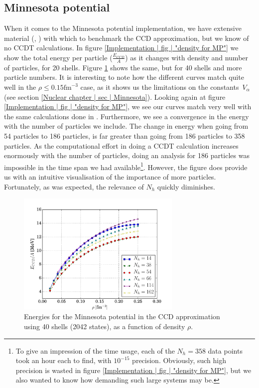\documentclass[10pt,twoside]{report}
\begin{document}
	\subsection{Minnesota potential}
	When it comes to the Minnesota potential implementation, we have extensive material (\cite{Holmen16}, \cite{HJensenLombardoKolck16}) with which to benchmark the CCD approximation, but we know of no CCDT calculations. In figure \ref{Implementation | fig | "density for MP"} we show the total energy per particle ($\frac{E_{CCD}}{A}$) as it changes with density and number of particles, for 20 shells. Figure \ref{Implementation | fig | "MP rho dependency Ns=40"} shows the same, but for 40 shells and more particle numbers. It is interesting to note how the different curves match quite well in the $\rho\leq 0.15\text{fm}^{-3}$ case, as it shows us the limitations on the constants $V_\alpha$ (see section \ref{Nuclear chapter | sec | Minnesota}). Looking again at figure \ref{Implementation | fig | "density for MP"}, we see our curves match very well with the same calculations done in \cite{HJensenLombardoKolck16}. Furthermore, we see a convergence in the energy with the number of particles we include. The change in energy when going from 54 particles to 186 particles, is far greater than going from 186 particles to 358 particles. As the computational effort in doing a CCDT calculation increases enormously with the number of particles, doing an analysis for 186 particles was impossible in the time span we had available\footnote{To give an impression of the time usage, each of the $N_h=358$ data points took an hour each to find, with $10^{-15}$ precision. Obviously, such high precision is wasted in figure \ref{Implementation | fig | "density for MP"}, but we also wanted to know how demanding such large systems may be.}. However, the figure does provide us with an intuitive visualisation of the importance of more particles. Fortunately, as was expected, the relevance of $N_h$ quickly diminishes.\\
	
	\begin{figure}
		\centering
		\captionsetup{width=.8\textwidth}
		\includegraphics[width=0.7\textwidth]{Figures/MP_CCD_DENSITY_RUNS.pdf}
		\caption{Energies for the Minnesota potential in the CCD approximation using 40 shells (2042 states), as a function of density $\rho$.}
		\label{Implementation | fig | "MP rho dependency Ns=40"}
	\end{figure}
	
\end{document}

